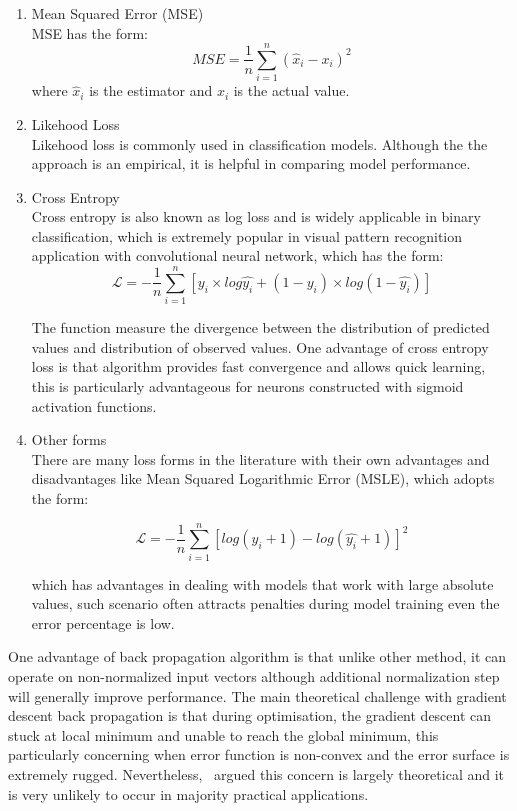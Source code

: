 \begin{enumerate}
    \item Mean Squared Error (MSE) \\
MSE has the form:
\begin{equation}
    MSE = \frac{1}{n}\sum_{i=1}^n (\hat{x}_i - x_i)^2
\end{equation}
where $\hat{x}_i$ is the estimator and $x_i$ is the actual value. 
    \item Likehood Loss \\
Likehood loss is commonly used in classification models. Although the the approach is an empirical, it is helpful in comparing model performance. 
    \item Cross Entropy \\
Cross entropy is also known as log loss and is widely applicable in binary classification, which is extremely popular in visual pattern recognition application with convolutional neural network, which has the form:
\begin{equation}
    \mathcal{L} = -\frac{1}{n}\sum_{i=1}^n [y_i \times log\hat{y_i} +(1-y_i) \times log(1-\hat{y_i}) ] 
\end{equation}

The function measure the divergence between the distribution of predicted values and distribution of observed values. One advantage of cross entropy loss is that algorithm provides fast convergence and allows quick learning, this is particularly advantageous for neurons constructed with sigmoid activation functions. 
    \item Other forms\\
There are many loss forms in the literature with their own advantages and disadvantages like Mean Squared Logarithmic Error (MSLE), which adopts the form:

\begin{equation}
    \mathcal{L} = -\frac{1}{n}\sum_{i=1}^n [log (y_i + 1) -  log(\hat{y_i} + 1) ]^2 
\end{equation}

which has advantages in dealing with models that work with large absolute values, such scenario often attracts penalties during model training even the error percentage is low. 
\end{enumerate}

\par 
One advantage of back propagation algorithm is that unlike other method, it can operate on non-normalized input vectors although additional normalization step will generally improve performance. \cite{Buckland:2002} The main theoretical challenge with gradient descent back propagation is that during optimisation, the gradient descent can stuck at local minimum and unable to reach the global minimum, this particularly concerning when error function is non-convex and the error surface is extremely rugged. Nevertheless,~\citet{LeCun_2015} argued this concern is largely theoretical and it is very unlikely to occur in majority practical applications. 